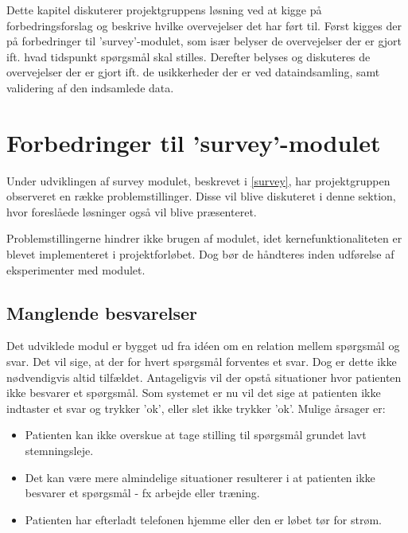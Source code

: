 \label{refleksion}
Dette kapitel diskuterer projektgruppens løsning ved at kigge på forbedringsforslag og beskrive hvilke overvejelser det har ført til.
Først kigges der på forbedringer til 'survey'-modulet, som især belyser de overvejelser der er gjort ift. hvad tidspunkt spørgsmål skal stilles.
Derefter belyses og diskuteres de overvejelser der er gjort ift. de usikkerheder der er ved dataindsamling, samt validering af den indsamlede data.

\section{Forbedringer til 'survey'-modulet}
Under udviklingen af survey modulet, beskrevet i \cref{survey}, har projektgruppen observeret en række problemstillinger.
Disse vil blive diskuteret i denne sektion, hvor foreslåede løsninger også vil blive præsenteret.

Problemstillingerne hindrer ikke brugen af modulet, idet kernefunktionaliteten er blevet implementeret i projektforløbet.
Dog bør de håndteres inden udførelse af eksperimenter med modulet.

\subsection{Manglende besvarelser}\label{reflection:manglende}
Det udviklede modul er bygget ud fra idéen om en relation mellem spørgsmål og svar.
Det vil sige, at der for hvert spørgsmål forventes et svar.
Dog er dette ikke nødvendigvis altid tilfældet.
Antageligvis vil der opstå situationer hvor patienten ikke besvarer et spørgsmål.
Som systemet er nu vil det sige at patienten ikke indtaster et svar og trykker 'ok', eller slet ikke trykker 'ok'.
Mulige årsager er:
\begin{itemize}
	\item Patienten kan ikke overskue at tage stilling til spørgsmål grundet lavt stemningsleje.
	\item Det kan være mere almindelige situationer resulterer i at patienten ikke besvarer et spørgsmål - fx arbejde eller træning.
	\item Patienten har efterladt telefonen hjemme eller den er løbet tør for strøm.
\end{itemize}

